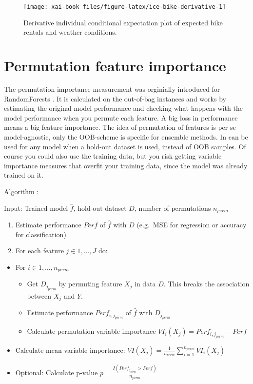 \documentclass[12pt,]{krantz}
\providecommand{\tightlist}{%
  \setlength{\itemsep}{0pt}\setlength{\parskip}{0pt}}
\theoremstyle{definition}
\theoremstyle{definition}
\theoremstyle{definition}
\theoremstyle{remark}
\begin{document}
\begin{figure}

{\centering \texttt{[image: xai-book\_files/figure-latex/ice-bike-derivative-1]} 

}

\caption{Derivative individual conditional expectation plot of expected bike rentals and weather conditions.}\label{fig:ice-bike-derivative}
\end{figure}

\section{Permutation feature
importance}\label{permutation-feature-importance}

The permutation importance measurement was orginially introduced for
RandomForests \citep{breiman2001random}. It is calculated on the
out-of-bag instances and works by estimating the original model
performance and checking what happens with the model performance when
you permute each feature. A big loss in performance means a big feature
importance. The idea of permutation of features is per se
model-agnostic, only the OOB-scheme is specific for ensemble methods. In
can be used for any model when a hold-out dataset is used, instead of
OOB samples. Of course you could also use the training data, but you
risk getting variable importance measures that overfit your training
data, since the model was already trained on it.

Algorithm \citep{breiman2001random}:

Input: Trained model \(\hat{f}\), hold-out dataset \(D\), number of
permutations \(n_{perm}\)

\begin{enumerate}
\def\labelenumi{\arabic{enumi}.}
\tightlist
\item
  Estimate performance \(Perf\) of \(\hat{f}\) with \(D\) (e.g.~MSE for
  regression or accuracy for classification)
\item
  For each feature \(j \in 1, \ldots, J\) do:
\end{enumerate}

\begin{itemize}
\tightlist
\item
  For \(i \in 1,\ldots , n_{perm}\)

  \begin{itemize}
  \tightlist
  \item
    Get \(D_{j_{perm}}\) by permuting feature \(X_j\) in data \(D\).
    This breaks the association between \(X_j\) and \(Y\).
  \item
    Estimate performance \(Perf_{i,j_{perm}}\) of \(\hat{f}\) with
    \(D_{j_{perm}}\)
  \item
    Calculate permutation variable importance
    \(VI_i(X_j) = Perf_{i,j_{perm}} - Perf\)
  \end{itemize}
\item
  Calculate mean variable importance:
  \(VI(X_j) = \frac{1}{n_{perm}}\sum_{i=1}^{n_{perm}} VI_i(X_j)\)
\item
  Optional: Calculate p-value
  \(p = \frac{I(Perf_{j_{perm}} > Perf)}{n_{perm}}\)
\end{itemize}
\end{document}
